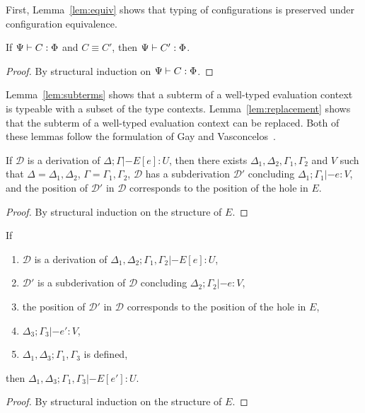 First, Lemma~\ref{lem:equiv} shows that typing of configurations is preserved
under configuration equivalence.

\begin{lemma}\label{lem:equiv}
  If $\Psi |- C : \Phi$ and $C \equiv C'$, then $\Psi |- C' : \Phi$.
  \begin{proof}
    By structural induction on $\Psi |- C : \Phi$.
  \end{proof}
\end{lemma}

Lemma~\ref{lem:subterms} shows that a subterm of a well-typed evaluation context
is typeable with a subset of the type contexts. Lemma~\ref{lem:replacement}
shows that the subterm of a well-typed evaluation context can be replaced. Both
of these lemmas follow the formulation of Gay and
Vasconcelos~\cite{gay2010linear}.

\begin{lemma}\label{lem:subterms}
  If $\mathcal{D}$ is a derivation of $\Delta; \Gamma |- E[e] : U$, then there exists $\Delta_1, \Delta_2,
  \Gamma_1,\Gamma_2$ and $V$ such that $\Delta = \Delta_1,\Delta_2$, $\Gamma = \Gamma_1,\Gamma_2$, $\mathcal{D}$ has a
  subderivation $\mathcal{D}'$ concluding $\Delta_1;\Gamma_1 |- e : V$, and the position of $\mathcal{D}'$ in
  $\mathcal{D}$ corresponds to the position of the hole in $E$.
  \begin{proof}
    By structural induction on the structure of $E$.
  \end{proof}
\end{lemma}

\begin{lemma}\label{lem:replacement}
  If
  \begin{enumerate}
  \item $\mathcal{D}$ is a derivation of $\Delta_1,\Delta_2;\Gamma_1,\Gamma_2 |- E[e] : U$,
  \item $\mathcal{D}'$ is a subderivation of $\mathcal{D}$ concluding $\Delta_2;
    \Gamma_2 |- e : V$,
  \item the position of $\mathcal{D}'$ in $\mathcal{D}$ corresponds to the
    position of the hole in $E$,
  \item $\Delta_3;\Gamma_3 |- e' : V$,
  \item $\Delta_1,\Delta_3;\Gamma_1,\Gamma_3$ is defined,
  \end{enumerate}
  then $\Delta_1,\Delta_3;\Gamma_1,\Gamma_3 |- E[e'] : U$.
  \begin{proof}
    By structural induction on the structure of $E$.
  \end{proof}  
\end{lemma}

